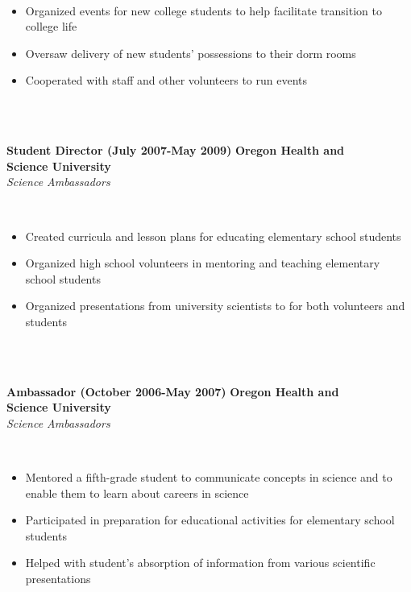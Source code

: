 \documentclass{article}
\begin{document}
\phantom \\
\begin{itemize}
\item Organized events for new college students to help facilitate transition to college life
\item Oversaw delivery of new students’ possessions to their dorm rooms
\item Cooperated with staff and other volunteers to run events
\end{itemize}
\phantom \\
\phantom \\
%
%
%
%
\begin{vwcol}[widths={0.8,0.2}, sep=.8cm, justify=flush, rule=0pt, indent=0em]
\noindent \textbf{Student Director (July 2007-May 2009)}
\newpage
\noindent \textbf{Oregon Health and}\\
\noindent \textbf{Science University}\\
\noindent \emph{Science Ambassadors}
\end{vwcol}
\phantom \\
\begin{itemize}
\item Created curricula and lesson plans for educating elementary school students
\item Organized high school volunteers in mentoring and teaching elementary school students
\item Organized presentations from university scientists to for both volunteers and students
\end{itemize}
\phantom \\
\phantom \\
%
%
%
%
\begin{vwcol}[widths={0.8,0.2}, sep=.8cm, justify=flush, rule=0pt, indent=0em]
\noindent \textbf{Ambassador (October 2006-May 2007)}
\newpage
\noindent \textbf{Oregon Health and}\\
\noindent \textbf{Science University}\\
\noindent \emph{Science Ambassadors}
\end{vwcol}
\phantom \\
\begin{itemize}
\item Mentored a fifth-grade student to communicate concepts in science and to enable them to learn about careers in science
\item Participated in preparation for educational activities for elementary school students
\item Helped with student’s absorption of information from various scientific presentations
\end{itemize}
\end{document}
